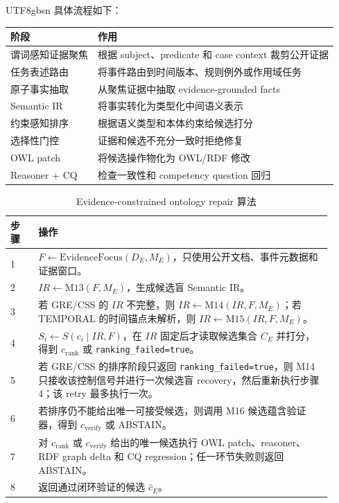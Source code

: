 \documentclass[11pt]{article}
\begin{document}
\begin{CJK*}{UTF8}{gbsn}
具体流程如下：

\begin{center}
\begin{tabular}{ll}
\toprule
阶段 & 作用 \\
\midrule
谓词感知证据聚焦 & 根据 subject、predicate 和 case context 裁剪公开证据 \\
任务表述路由 & 将事件路由到时间版本、规则例外或作用域任务 \\
原子事实抽取 & 从聚焦证据中抽取 evidence-grounded facts \\
Semantic IR & 将事实转化为类型化中间语义表示 \\
约束感知排序 & 根据语义类型和本体约束给候选打分 \\
选择性门控 & 证据和候选不充分一致时拒绝修复 \\
OWL patch & 将候选操作物化为 OWL/RDF 修改 \\
Reasoner + CQ & 检查一致性和 competency question 回归 \\
\bottomrule
\end{tabular}
\end{center}

\begin{table}[t]
\centering
\caption{Evidence-constrained ontology repair 算法}
\label{tab:algorithm}
\begin{tabular}{p{0.08\linewidth}p{0.84\linewidth}}
\toprule
步骤 & 操作 \\
\midrule
1 & $F \leftarrow \mathrm{EvidenceFocus}(D_E, M_E)$，只使用公开文档、事件元数据和证据窗口。 \\
2 & $IR \leftarrow \mathrm{M13}(F, M_E)$，生成候选盲 Semantic IR。 \\
3 & 若 GRE/CSS 的 $IR$ 不完整，则 $IR \leftarrow \mathrm{M14}(IR,F,M_E)$；若 TEMPORAL 的时间锚点未解析，则 $IR \leftarrow \mathrm{M15}(IR,F,M_E)$。 \\
4 & $S_i \leftarrow S(c_i \mid IR,F)$，在 $IR$ 固定后才读取候选集合 $C_E$ 并打分，得到 $c_{\mathrm{rank}}$ 或 \texttt{ranking\_failed=true}。 \\
5 & 若 GRE/CSS 的排序阶段只返回 \texttt{ranking\_failed=true}，则 M14 只接收该控制信号并进行一次候选盲 recovery，然后重新执行步骤 4；该 retry 最多执行一次。 \\
6 & 若排序仍不能给出唯一可接受候选，则调用 M16 候选蕴含验证器，得到 $c_{\mathrm{verify}}$ 或 ABSTAIN。 \\
7 & 对 $c_{\mathrm{rank}}$ 或 $c_{\mathrm{verify}}$ 给出的唯一候选执行 OWL patch、reasoner、RDF graph delta 和 CQ regression；任一环节失败则返回 ABSTAIN。 \\
8 & 返回通过闭环验证的候选 $\hat{c}_E$。 \\
\bottomrule
\end{tabular}
\end{table}


\end{CJK*}
\end{document}
